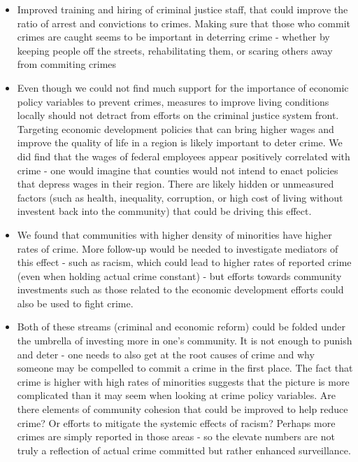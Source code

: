 \documentclass[]{article}
\begin{document}
\begin{itemize}
\item
  Improved training and hiring of criminal justice staff, that could
  improve the ratio of arrest and convictions to crimes. Making sure
  that those who commit crimes are caught seems to be important in
  deterring crime - whether by keeping people off the streets,
  rehabilitating them, or scaring others away from commiting crimes
\item
  Even though we could not find much support for the importance of
  economic policy variables to prevent crimes, measures to improve
  living conditions locally should not detract from efforts on the
  criminal justice system front. Targeting economic development policies
  that can bring higher wages and improve the quality of life in a
  region is likely important to deter crime. We did find that the wages
  of federal employees appear positively correlated with crime - one
  would imagine that counties would not intend to enact policies that
  depress wages in their region. There are likely hidden or unmeasured
  factors (such as health, inequality, corruption, or high cost of
  living without investent back into the community) that could be
  driving this effect.
\item
  We found that communities with higher density of minorities have
  higher rates of crime. More follow-up would be needed to investigate
  mediators of this effect - such as racism, which could lead to higher
  rates of reported crime (even when holding actual crime constant) -
  but efforts towards community investments such as those related to the
  economic development efforts could also be used to fight crime.
\item
  Both of these streams (criminal and economic reform) could be folded
  under the umbrella of investing more in one's community. It is not
  enough to punish and deter - one needs to also get at the root causes
  of crime and why someone may be compelled to commit a crime in the
  first place. The fact that crime is higher with high rates of
  minorities suggests that the picture is more complicated than it may
  seem when looking at crime policy variables. Are there elements of
  community cohesion that could be improved to help reduce crime? Or
  efforts to mitigate the systemic effects of racism? Perhaps more
  crimes are simply reported in those areas - so the elevate numbers are
  not truly a reflection of actual crime committed but rather enhanced
  surveillance.
\end{itemize}
\end{document}
